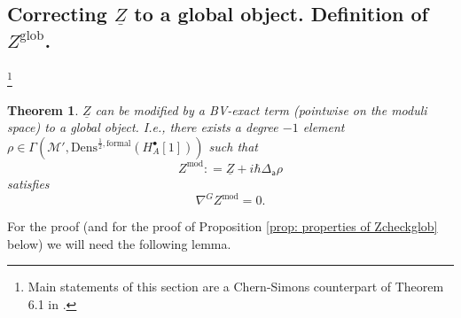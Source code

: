 \documentclass[11pt,a4paper]{amsart}
\theoremstyle{plain} %
\newtheorem{thm}{Theorem}[section]
\theoremstyle{definition}
\theoremstyle{remark}
\newcommand{\mr}{\mathrm}
\newcommand{\sfa}{\mathsf{a}}
\newcommand{\bt}{\bullet}
\newcommand{\M}{\mathcal{M}}
\newcommand{\ul}{\underline}
\begin{document}
\subsection{Correcting $\ul{Z}$ to a global object. Definition of 
$Z^\mr{glob}$.}\footnote{Main statements of this section are a Chern-Simons counterpart of Theorem 6.1 in \cite{Bonechi2012}.}
\label{ss Zglob}
\begin{thm}\label{thm 5.15}
$\ul{Z}$ can be modified by a BV-exact term (pointwise on the moduli space) to a global object. I.e., there exists a degree $-1$ element $\rho\in \Gamma(\M',\mr{Dens}^{\frac12,\mr{formal}}(H^\bt_{A}[1]))$ such that 
\begin{equation}\label{Zmod}
Z^\mr{mod}\colon= \ul{Z}+i\hbar\Delta_\sfa \rho
\end{equation}
satisfies
    \begin{equation}
        \nabla^G Z^\mr{mod}=0.
    \end{equation}
\end{thm}


For the proof (and for the proof of Proposition \ref{prop: properties of Zcheckglob} below) we will need the following lemma.
\end{document}
